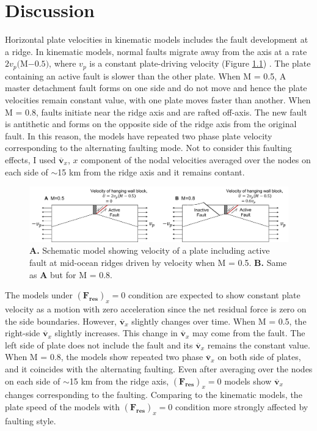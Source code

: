 \documentclass[letterpaper,12pt,notitle]{memphisthesis}                     %
\begin{document}
\chapter{Discussion}

Horizontal plate velocities in kinematic models includes the fault development at a ridge. In kinematic models, normal faults migrate away from the axis at a rate $2v_p($M$-0.5)$, where $v_p$ is a constant plate-driving velocity (Figure \ref{fig:hangingwall}) \citep{Buck2005}. The plate containing an active fault is slower than the other plate. When M = 0.5, A master detachment fault forms on one side and do not move and hence the plate velocities remain constant value, with one plate moves faster than another. When M = 0.8, faults initiate near the ridge axis and are rafted off-axis. The new fault is antithetic and forms on the opposite side of the ridge axis from the original fault. In this reason, the models have repeated two phase plate velocity corresponding to the alternating faulting mode. Not to consider this faulting effects, I used $\overline{\boldsymbol{v}}_{x}$, $x$ component of the nodal velocities averaged over the nodes on each side of $\sim$15 km from the ridge axis and it remains contant.

\begin{figure}[!htb]
	\centering
	\includegraphics[width=0.99\linewidth]{./figs/hangingwall.pdf}
	\caption{\textbf{A.} Schematic model showing velocity of a plate including active fault at mid-ocean ridges driven by velocity when M = 0.5. \textbf{B.} Same as \textbf{A} but for M = 0.8.}
	\label{fig:hangingwall}
\end{figure}

The models under $(\boldsymbol{F_{res}})_x=0$ condition are expected to show constant plate velocity as a motion with zero acceleration since the net residual force is zero on the side boundaries. However, $\overline{\boldsymbol{v}}_{x}$ slightly changes over time. When M = 0.5, the right-side $\overline{\boldsymbol{v}}_{x}$ slightly increases. This change in $\overline{\boldsymbol{v}}_{x}$ may come from the fault. The left side of plate does not include the fault and its $\overline{\boldsymbol{v}}_{x}$ remains the constant value. When M = 0.8, the models show repeated two phase $\overline{\boldsymbol{v}}_{x}$ on both side of plates, and it coincides with the alternating faulting. 
Even after averaging over the nodes on each side of $\sim$15 km from the ridge axis, $(\boldsymbol{F_{res}})_x=0$ models show $\overline{\boldsymbol{v}}_{x}$ changes corresponding to the faulting. Comparing to the kinematic models, the plate speed of the models with $(\boldsymbol{F_{res}})_x=0$ condition more strongly affected by faulting style.
\end{document}
